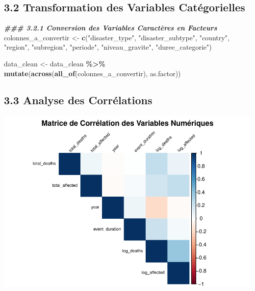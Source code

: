 \documentclass[
]{article}
\newenvironment{Shaded}{\begin{snugshade}}{\end{snugshade}}
\newcommand{\DocumentationTok}[1]{\textcolor[rgb]{0.56,0.35,0.01}{\textbf{\textit{#1}}}}
\newcommand{\FunctionTok}[1]{\textcolor[rgb]{0.13,0.29,0.53}{\textbf{#1}}}
\newcommand{\NormalTok}[1]{#1}
\newcommand{\OtherTok}[1]{\textcolor[rgb]{0.56,0.35,0.01}{#1}}
\newcommand{\SpecialCharTok}[1]{\textcolor[rgb]{0.81,0.36,0.00}{\textbf{#1}}}
\newcommand{\StringTok}[1]{\textcolor[rgb]{0.31,0.60,0.02}{#1}}
\begin{document}
\subsection{3.2 Transformation des Variables
Catégorielles}\label{transformation-des-variables-catuxe9gorielles}

\begin{Shaded}
\begin{Highlighting}[]
\DocumentationTok{\#\#\# 3.2.1 Conversion des Variables Caractères en Facteurs}
\NormalTok{colonnes\_a\_convertir }\OtherTok{\textless{}{-}} \FunctionTok{c}\NormalTok{(}\StringTok{"disaster\_type"}\NormalTok{, }\StringTok{"disaster\_subtype"}\NormalTok{, }
                           \StringTok{"country"}\NormalTok{, }\StringTok{"region"}\NormalTok{, }\StringTok{"subregion"}\NormalTok{, }
                           \StringTok{"periode"}\NormalTok{, }\StringTok{"niveau\_gravite"}\NormalTok{, }\StringTok{"duree\_categorie"}\NormalTok{)}

\NormalTok{data\_clean }\OtherTok{\textless{}{-}}\NormalTok{ data\_clean }\SpecialCharTok{\%\textgreater{}\%}
  \FunctionTok{mutate}\NormalTok{(}\FunctionTok{across}\NormalTok{(}\FunctionTok{all\_of}\NormalTok{(colonnes\_a\_convertir), as.factor))}
\end{Highlighting}
\end{Shaded}

\subsection{3.3 Analyse des
Corrélations}\label{analyse-des-corruxe9lations}

\includegraphics{Projet_ML_files/figure-latex/unnamed-chunk-5-1.pdf}
\end{document}
